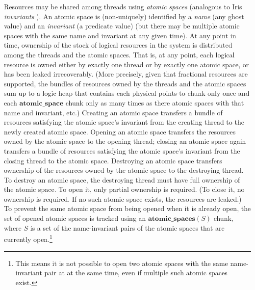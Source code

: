\documentclass{article}
\begin{document}
Resources may be shared among threads using \emph{atomic spaces} (analogous to Iris \emph{invariants} \cite{iris1,iris-ground-up}). An atomic space is (non-uniquely) identified by a \emph{name} (any ghost value) and an \emph{invariant} (a predicate value) (but there may be multiple atomic spaces with the same name and invariant at any given time). At any point in time, ownership of the stock of logical resources in the system is distributed among the threads and the atomic spaces. That is, at any point, each logical resource is owned either by exactly one thread or by exactly one atomic space, or has been leaked irrecoverably. (More precisely, given that fractional resources are supported, the bundles of resources owned by the threads and the atomic spaces sum up to a logic heap that contains each physical points-to chunk only once and each $\mathbf{atomic\_space}$ chunk only as many times as there atomic spaces with that name and invariant, etc.) Creating an atomic space transfers a bundle of resources satisfying the atomic space's invariant from the creating thread to the newly created atomic space. Opening an atomic space transfers the resources owned by the atomic space to the opening thread; closing an atomic space again transfers a bundle of resources satisfying the atomic space's invariant from the closing thread to the atomic space. Destroying an atomic space transfers ownership of the resources owned by the atomic space to the destroying thread. To destroy an atomic space, the destroying thread must have full ownership of the atomic space. To open it, only partial ownership is required. (To close it, no ownership is required. If no such atomic space exists, the resources are leaked.) To prevent the same atomic space from being opened when it is already open, the set of opened atomic spaces is tracked using an $\mathbf{atomic\_spaces}(S)$ chunk, where $S$ is a set of the name-invariant pairs of the atomic spaces that are currently open.\footnote{This means it is not possible to open two atomic spaces with the same name-invariant pair at at the same time, even if multiple such atomic spaces exist.}
\end{document}

